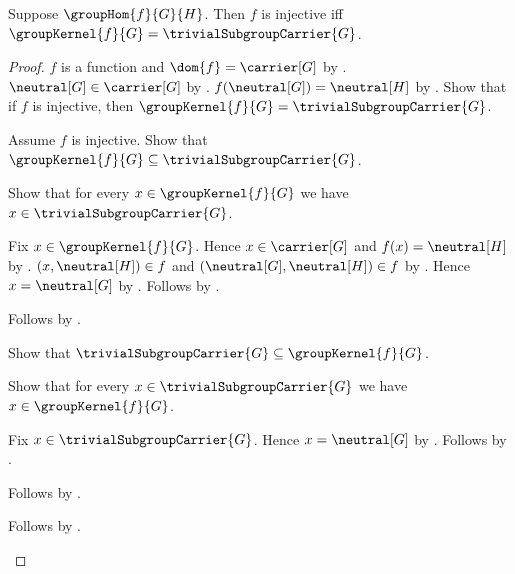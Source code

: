 \begin{theorem}\label{group_hom_injective_iff_kernel_trivial}
    Suppose $\groupHom{f}{G}{H}$.
    Then $f$ is injective iff
        $\groupKernel{f}{G}=\trivialSubgroupCarrier{G}$.
\end{theorem}
\begin{proof}
    $f$ is a function and $\dom{f}=\carrier[G]$ by
        .
    $\neutral[G]\in\carrier[G]$ by
        .
    $f(\neutral[G])=\neutral[H]$ by
        .
    Show that if $f$ is injective, then
        $\groupKernel{f}{G}=\trivialSubgroupCarrier{G}$.
    \begin{subproof}
        Assume $f$ is injective.
        Show that
            $\groupKernel{f}{G}\subseteq
                \trivialSubgroupCarrier{G}$.
        \begin{subproof}
            Show that for every $x\in\groupKernel{f}{G}$ we have
                $x\in\trivialSubgroupCarrier{G}$.
            \begin{subproof}
                Fix $x\in\groupKernel{f}{G}$.
                Hence $x\in\carrier[G]$ and $f(x)=\neutral[H]$ by
                    .
                $(x,\neutral[H])\in f$ and
                    $(\neutral[G],\neutral[H])\in f$ by
                    .
                Hence $x=\neutral[G]$ by .
                Follows by
                    .
            \end{subproof}
            Follows by .
        \end{subproof}
        Show that
            $\trivialSubgroupCarrier{G}\subseteq
                \groupKernel{f}{G}$.
        \begin{subproof}
            Show that for every $x\in\trivialSubgroupCarrier{G}$ we have
                $x\in\groupKernel{f}{G}$.
            \begin{subproof}
                Fix $x\in\trivialSubgroupCarrier{G}$.
                Hence $x=\neutral[G]$ by
                    .
                Follows by .
            \end{subproof}
            Follows by .
        \end{subproof}
        Follows by .
    \end{subproof}

\end{proof}
